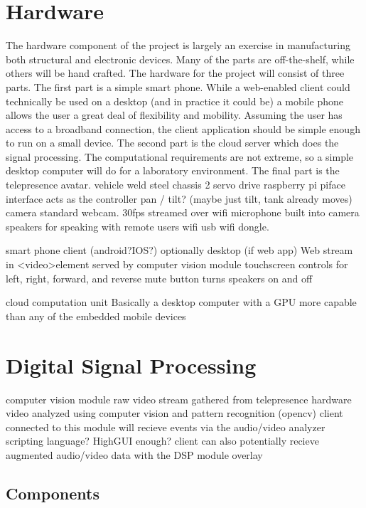 \documentclass[a4paper,12pt]{report}
\begin{document}
\section{Hardware}
	The hardware component of the project is largely an exercise in manufacturing both structural and electronic devices. Many of the parts are off-the-shelf, while others will be hand crafted. The hardware for the project will consist of three parts. 
	The first part is a simple smart phone. While a web-enabled client could technically be used on a desktop (and in practice it could be) a mobile phone allows the user a great deal of flexibility and mobility. Assuming the user has access to a broadband connection, the client application should be simple enough to run on a small device. 
	The second part is the cloud server which does the signal processing. The computational requirements are not extreme, so a simple desktop computer will do for a laboratory environment.
	The final part is the telepresence avatar.
	vehicle
		weld steel chassis
		2 servo drive
			raspberry pi piface interface acts as the controller
			pan / tilt? (maybe just tilt, tank already moves)
		camera
			standard webcam. 30fps streamed over wifi
		microphone
			built into camera
		speakers
			for speaking with remote users
		wifi
			usb wifi dongle.

	smart phone client (android?IOS?) optionally desktop (if web app)
		Web stream in \textless video\textgreater element served by computer vision module
		touchscreen controls for left, right, forward, and reverse
		mute button turns speakers on and off
	
	cloud computation unit
		Basically a desktop computer with a GPU more capable than any of the embedded mobile devices
	
\section{Digital Signal Processing}
	computer vision module
	raw video stream gathered from telepresence hardware
	video analyzed using computer vision and pattern recognition (opencv)
	client connected to this module will recieve events via the audio/video analyzer
		scripting language? HighGUI enough?
	client can also potentially recieve augmented audio/video data with the DSP module overlay
	
\subsection{Components}
\end{document}
